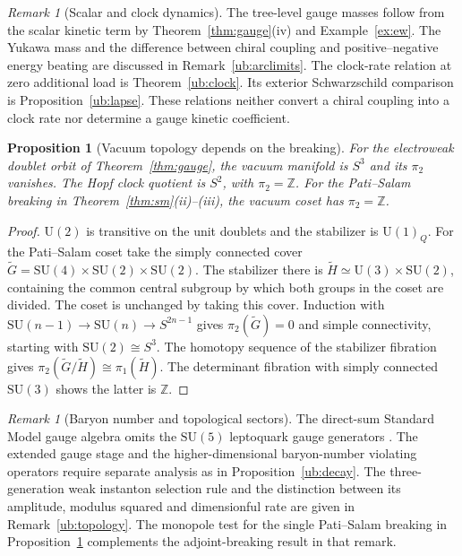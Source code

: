 \documentclass[aps,pra,onecolumn,superscriptaddress,nofootinbib,10pt]{revtex4-2}
\newtheorem{proposition}[theorem]{Proposition}
\theoremstyle{definition}
\theoremstyle{remark}
\newtheorem{remark}[theorem]{Remark}
\newcommand{\SU}{\mathrm{SU}}
\begin{document}
\begin{remark}[Scalar and clock dynamics]\label{cr:boundary}
The tree-level gauge masses follow from the scalar kinetic term
by Theorem~\ref{thm:gauge}(iv) and Example~\ref{ex:ew}.
The Yukawa mass and the difference between chiral coupling and
positive--negative energy beating are discussed in
Remark~\ref{ub:arclimits}. The clock-rate relation at zero
additional load is Theorem~\ref{ub:clock}. Its exterior
Schwarzschild comparison is Proposition~\ref{ub:lapse}.
These relations neither convert a chiral coupling into a clock
rate nor determine a gauge kinetic coefficient.
\end{remark}

\begin{proposition}[Vacuum topology depends on the breaking]\label{cr:topology}
For the electroweak doublet orbit of Theorem~\ref{thm:gauge},
the vacuum manifold is $S^3$ and its $\pi_2$ vanishes. The
Hopf clock quotient is $S^2$, with $\pi_2=\mathbb Z$. For the
Pati--Salam breaking in Theorem~\ref{thm:sm}(ii)--(iii),
the vacuum coset has $\pi_2=\mathbb Z$.
\end{proposition}
\begin{proof}
$\mathrm U(2)$ is transitive on the unit doublets and the
stabilizer is $\mathrm U(1)_Q$. For the Pati--Salam coset take
the simply connected cover $\widetilde G=\SU(4)\times
\SU(2)\times\SU(2)$. The stabilizer there is
$\widetilde H\simeq\mathrm U(3)\times\SU(2)$, containing
the common central subgroup by which both groups in the coset
are divided. The coset is unchanged by taking this cover.
Induction with $\SU(n-1)\to\SU(n)\to
S^{2n-1}$ gives $\pi_2(\widetilde G)=0$ and simple connectivity,
starting with $\SU(2)\cong S^3$. The homotopy sequence
of the stabilizer fibration gives
$\pi_2(\widetilde G/\widetilde H)\cong\pi_1(\widetilde H)$.
The determinant fibration with simply connected
$\SU(3)$ shows the latter is $\mathbb Z$.
\end{proof}

\begin{remark}[Baryon number and topological sectors]\label{cr:baryon}
The direct-sum Standard Model gauge algebra omits the
$\SU(5)$ leptoquark gauge generators \cite{cr:gg}.
The extended gauge stage and the higher-dimensional
baryon-number violating operators require separate analysis
as in Proposition~\ref{ub:decay}. The three-generation weak
instanton selection rule and the distinction between its
amplitude, modulus squared and dimensionful rate are given in
Remark~\ref{ub:topology}. The monopole test for the single
Pati--Salam breaking in Proposition~\ref{cr:topology}
complements the adjoint-breaking result in that remark.
\end{remark}
\end{document}
